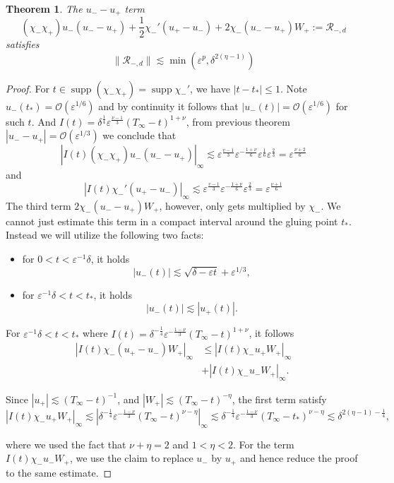 \documentclass[letterpaper,11pt]{article}
\newcommand{\rmO}{\mathcal{O}}
\newcommand{\eps}{\varepsilon}
\newcommand{\lar}{ \lesssim }
\newcommand{\supp}{\operatorname{supp}}
\numberwithin{equation}{section}
\theoremstyle{plain}
\newtheorem{theorem}{Theorem}[section]
\begin{document}
\begin{enumerate}
\begin{itemize}
\begin{enumerate}
\begin{theorem}
The $u_--u_+$ term
\[
  (\chi_-\chi_+)u_-(u_--u_+) +\frac{1}{2}\chi_-'(u_+-u_-) + 2\chi_-(u_- -u_+)W_+ := \mathcal{R}_{-,d}
\]
satisfies
\[
\| \mathcal{R}_{-,d} \| \lar \min(\eps^{p}, \delta^{2(\eta-1)} )
\]
\end{theorem}
\begin{proof}
For $t\in \supp (\chi_-\chi_+) = \supp \chi_-'$, we have $|t-t_*| \le 1$. Note $u_-(t_*) = \rmO(\eps^{1/6})$ and by continuity it follows that $|u_-(t)| = \rmO(\eps^{1/6})$ for such $t$. And $I(t)=\delta^{\frac{1}{4}}\eps^{\frac{\nu-1}{3}}(T_\infty-t)^{1+\nu}$, from previous theorem $|u_- - u_+| = \rmO(\eps^{1/3})$ we conclude that
\[
|I(t) (\chi_-\chi_+)u_-(u_--u_+)|_\infty \lar \eps^{\frac{v-1}{3}} \eps^{-\frac{1+\nu}{6}} \eps^{\frac{1}{6}}\eps^{\frac{2}{3}} = \eps^{\frac{\nu+2}{6}}
\]
 and
\[
|I(t) \chi_-'(u_+-u_-) |_\infty \lar\eps^{\frac{v-1}{3}} \eps^{-\frac{1+\nu}{6}} \eps^{\frac{2}{3}} = \eps^{\frac{\nu+1}{6}}
\]
 The third term $2\chi_-(u_- -u_+)W_+$, however, only gets multiplied by $\chi_-$. We cannot just estimate this term in a compact interval around the gluing point $t_*$. Instead we will utilize the following two facts:
\begin{itemize}
\item for $0<t<\eps^{-1}\delta$, it holds
\[
 |u_-(t)| \lar \sqrt{\delta-\eps t}+\eps^{1/3},
 \]
 \item for $\eps^{-1}\delta < t <t_*$, it holds
 \[
 |u_-(t)|\lar |u_+(t)|.
 \]
\end{itemize}

For $\eps^{-1}\delta<t<t_*$ where $I(t) = \delta^{-\frac{1}{4}}\eps^{-\frac{1-\nu}{3}} (T_\infty - t)^{1+\nu}$, it follows
\begin{align*}
|I(t)  \chi_-(u_+ - u_-)W_+|_\infty &\le |I(t) \chi_-u_+ W_+|_\infty\\
&+|I(t) \chi_-u_- W_+|_\infty.
\end{align*}
 
Since $|u_+| \lar (T_\infty -t)^{-1}$, and $|W_+| \lar (T_\infty-t)^{-\eta}$, the first term satisfy
\[
|I(t)\chi_-u_+ W_+|_\infty \lar |\delta^{-\frac{1}{4}}\eps^{-\frac{1-\nu}{3}} (T_\infty-t)^{\nu - \eta} |_\infty \lar \delta^{-\frac{1}{4}}\eps^{-\frac{1-\nu}{3}} (T_\infty-t_*)^{\nu - \eta} \lar \delta^{2(\eta-1)-\frac{1}{4}},
\]

where we used the fact that $\nu+\eta =2 $ and $1<\eta<2$. For the term $I(t)\chi_-u_-W_+$, we use the claim to replace $u_-$ by $u_+$ and hence reduce the proof to the same estimate.



\end{proof}
\end{enumerate}
\end{itemize}
\end{enumerate}
\end{document}
